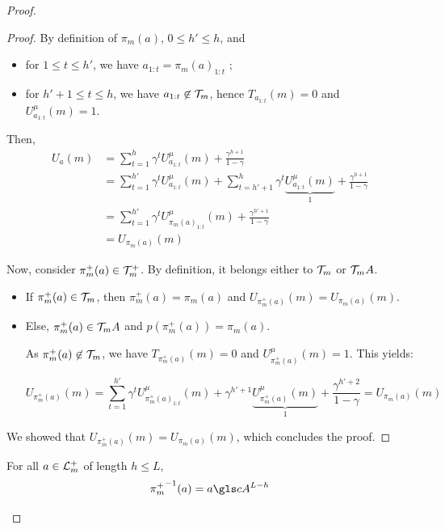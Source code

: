 \begin{subappendices}
\begin{proof}
\begin{proof}
		By definition of $\pi_m(a)$, $0 \leq h' \leq h$, and
		\begin{itemize}
			\item for $1\leq t \leq h'$, we have $a_{1:t} = {\pi_m(a)}_{1:t}$ ;
			\item for $h'+1\leq t \leq h$, we have $a_{1:t} \not \in \mathcal{T}_m$, hence $T_{a_{1:t}}(m) = 0$ and $U^{\mu}_{a_{1:t}}(m) = 1$.
		\end{itemize}
		Then,
		\begin{align*}
		U_a(m) &= \sum_{t=1}^h \gamma^t U^{\mu}_{a_{1:t}}(m) + \frac{\gamma^{h+1}}{1-\gamma} \\
		&= \sum_{t=1}^{h'} \gamma^t U^{\mu}_{a_{1:t}}(m) + \sum_{t=h'+1}^h \gamma^t \underbrace{U^{\mu}_{a_{1:t}}(m)}_1 + \frac{\gamma^{h+1}}{1-\gamma} \\
		&= \sum_{t=1}^{h'} \gamma^t U^{\mu}_{{\pi_m(a)}_{1:t}}(m) + \frac{\gamma^{h'+1}}{1-\gamma} \\
		&= U_{\pi_m(a)}(m)
		\end{align*}
		
		Now, consider $\pi_m^+(a) \in \mathcal{T}_m^+$.
		By definition, it belongs either to $\mathcal{T}_m$ or $\mathcal{T}_m A$.
		\begin{itemize}
			\item If $\pi_m^+(a) \in \mathcal{T}_m$, then $\pi_m^+(a) = \pi_m(a)$ and $U_{\pi_m^+(a)}(m) = U_{\pi_m(a)}(m)$.
			\item Else, $\pi_m^+(a) \in \mathcal{T}_m A$ and $p(\pi_m^+(a)) = \pi_m(a)$.
			
			As $\pi_m^+(a) \not \in \mathcal{T}_m$, we have $T_{\pi_m^+(a)}(m) = 0$ and $U^{\mu}_{\pi_m^+(a)}(m) = 1$.
			This yields:
			
			\begin{equation*}
			U_{\pi_m^+(a)}(m) = \sum_{t=1}^{h'} \gamma^t U^{\mu}_{{\pi_m^+(a)}_{1:t}}(m) + \gamma^{h'+1} \underbrace{U^{\mu}_{{\pi_m^+(a)}}(m)}_1 + \frac{\gamma^{h'+2}}{1-\gamma} = U_{\pi_m(a)}(m)
			\end{equation*}
			
		\end{itemize}
		We showed that $U_{\pi_m^+(a)}(m) = U_{\pi_m(a)}(m)$, which concludes the proof.
	\end{proof}
	
	\begin{lemma}
		\begin{leftbar}[lemmabar]
		\label{lemma:inverse-proj}
		For all $a\in \mathcal{L}_m^+$ of length $h\leq L$,
		\begin{equation*}
		{\pi_m^+}^{-1}(a) = a \cA^{L-h}
		\end{equation*}
		

\end{leftbar}
\end{lemma}
\end{proof}
\end{subappendices}
